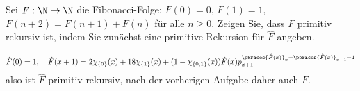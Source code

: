 
\begin{exercise}[217]

\phantom{}
	Sei $F: \N \to \N$ die Fibonacci-Folge: $F(0) = 0$, $F(1) = 1$, $F(n + 2) = F(n + 1) + F(n)$ für alle $n \geq 0$. Zeigen Sie, dass $F$ primitiv rekursiv ist, indem Sie zunächst eine primitive Rekursion für $\hat{F}$ angeben.

\end{exercise}


\begin{solution}

\phantom{}
	\begin{align*}
	\hat{F}(0) = 1, \quad \hat{F}(x + 1) = 2 \chi_{\{0\}}(x) + 18 \chi_{\{1\}}(x) + (1 - \chi_{\{0, 1\}}(x)) \hat{F}(x) p_{x + 1}^{\pbraces{\hat{F}(x)}_x + \pbraces{\hat{F}(x)}_{x - 1} - 1} 
	\end{align*}
	also ist $\hat{F}$ primitiv rekursiv, nach der vorherigen Aufgabe daher auch $F$. 
\end{solution}
